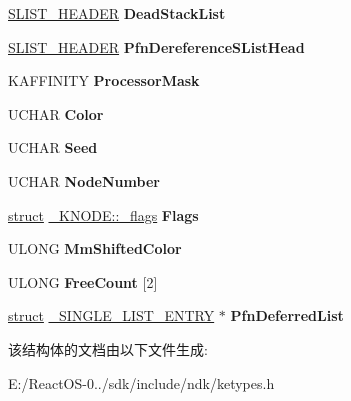 \begin{DoxyCompactItemize}
\item 
\mbox{\label{struct___k_n_o_d_e_a084bc0b80c0a82c4b49027cb77c785ce}} 
\hyperlink{union___s_l_i_s_t___h_e_a_d_e_r}{S\+L\+I\+S\+T\+\_\+\+H\+E\+A\+D\+ER} {\bfseries Dead\+Stack\+List}
\item 
\mbox{\label{struct___k_n_o_d_e_ac2bf7e5dfd3973af829265ca12d2fc76}} 
\hyperlink{union___s_l_i_s_t___h_e_a_d_e_r}{S\+L\+I\+S\+T\+\_\+\+H\+E\+A\+D\+ER} {\bfseries Pfn\+Dereference\+S\+List\+Head}
\item 
\mbox{\label{struct___k_n_o_d_e_a92060eb0c31e3ff6113a9fba9d442e46}} 
K\+A\+F\+F\+I\+N\+I\+TY {\bfseries Processor\+Mask}
\item 
\mbox{\label{struct___k_n_o_d_e_ac44ab9fc3d528fee4421b0f347fc7597}} 
U\+C\+H\+AR {\bfseries Color}
\item 
\mbox{\label{struct___k_n_o_d_e_a2646bfa556861d272eef0ce2cc06997c}} 
U\+C\+H\+AR {\bfseries Seed}
\item 
\mbox{\label{struct___k_n_o_d_e_a7f587fd5d4f28b19b5bc38fc47d8ceb1}} 
U\+C\+H\+AR {\bfseries Node\+Number}
\item 
\mbox{\label{struct___k_n_o_d_e_ab4ef0cfb29d302d3d63ebed8dc2576cc}} 
\hyperlink{interfacestruct}{struct} \hyperlink{struct___k_n_o_d_e_1_1__flags}{\+\_\+\+K\+N\+O\+D\+E\+::\+\_\+flags} {\bfseries Flags}
\item 
\mbox{\label{struct___k_n_o_d_e_a59ec42d394cd23c9742291b71d07cac4}} 
U\+L\+O\+NG {\bfseries Mm\+Shifted\+Color}
\item 
\mbox{\label{struct___k_n_o_d_e_a9bcb98cc3551981fc7f5440d7361b9cb}} 
U\+L\+O\+NG {\bfseries Free\+Count} \mbox{[}2\mbox{]}
\item 
\mbox{\label{struct___k_n_o_d_e_a771cb88a91e600ccfc074c8701ff91b4}} 
\hyperlink{interfacestruct}{struct} \hyperlink{struct___s_i_n_g_l_e___l_i_s_t___e_n_t_r_y}{\+\_\+\+S\+I\+N\+G\+L\+E\+\_\+\+L\+I\+S\+T\+\_\+\+E\+N\+T\+RY} $\ast$ {\bfseries Pfn\+Deferred\+List}
\end{DoxyCompactItemize}


该结构体的文档由以下文件生成\+:\begin{DoxyCompactItemize}
\item 
E\+:/\+React\+O\+S-\/0../sdk/include/ndk/ketypes.\+h\end{DoxyCompactItemize}
